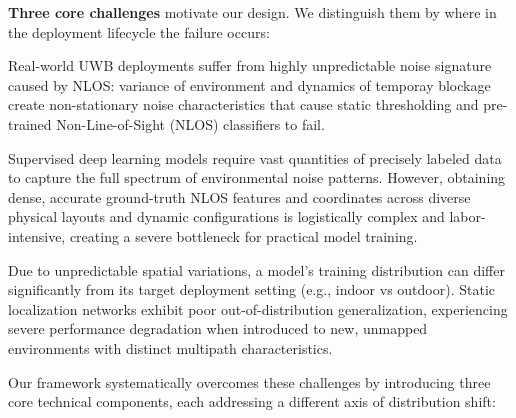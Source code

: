 \documentclass[11pt]{article}
\begin{document}
\bigskip

\noindent\textbf{Three core challenges} motivate our design. We distinguish them by where in the deployment lifecycle the failure occurs:

\begin{description}[leftmargin=1.8cm, style=nextline]
  \item[\textbf{Volatile, Non-Stationary Noise Patterns.}] Real-world UWB deployments suffer from highly unpredictable noise signature caused by NLOS: variance of environment and dynamics of temporay blockage create non-stationary noise characteristics that cause static thresholding and pre-trained Non-Line-of-Sight (NLOS) classifiers to fail.

  \item[\textbf{High Data Acquisition Overhead.}] Supervised deep learning models require vast quantities of precisely labeled data to capture the full spectrum of environmental noise patterns. However, obtaining dense, accurate ground-truth NLOS features and coordinates across diverse physical layouts and dynamic configurations is logistically complex and labor-intensive, creating a severe bottleneck for practical model training.

  \item[\textbf{Limited Cross-Environment Generalization.}] Due to unpredictable spatial variations, a model's training distribution can differ significantly from its target deployment setting (e.g., indoor vs outdoor). Static localization networks exhibit poor out-of-distribution generalization, experiencing severe performance degradation when introduced to new, unmapped environments with distinct multipath characteristics.
\end{description}

\noindent Our framework systematically overcomes these challenges by introducing three core technical components, each addressing a different axis of distribution shift:
\end{document}
